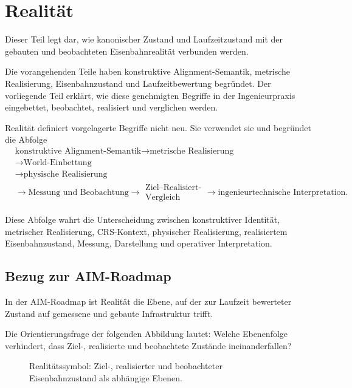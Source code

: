 
\chapter*{Realität}
{}

Dieser Teil legt dar, wie kanonischer Zustand und Laufzeitzustand mit der
gebauten und beobachteten Eisenbahnrealität verbunden werden.

Die vorangehenden Teile haben konstruktive Alignment-Semantik, metrische
Realisierung, Eisenbahnzustand und Laufzeitbewertung begründet. Der vorliegende
Teil erklärt, wie diese genehmigten Begriffe in der Ingenieurpraxis
eingebettet, beobachtet, realisiert und verglichen werden.

Realität definiert vorgelagerte Begriffe nicht neu. Sie verwendet sie und
begründet die Abfolge
\[
\begin{aligned}
&\text{konstruktive Alignment-Semantik}
\rightarrow
\text{metrische Realisierung}
\\
&\rightarrow
\text{World-Einbettung}
\\
&\rightarrow
\text{physische Realisierung}
\\
&\rightarrow
\text{Messung und Beobachtung}
\rightarrow
\substack{\text{Ziel--Realisiert-}\\\text{Vergleich}}
\rightarrow
\text{ingenieurtechnische Interpretation}.
\end{aligned}
\]

Diese Abfolge wahrt die Unterscheidung zwischen konstruktiver Identität,
metrischer Realisierung, CRS-Kontext, physischer Realisierung, realisiertem
Eisenbahnzustand, Messung, Darstellung und operativer Interpretation.

\section*{Bezug zur AIM-Roadmap}

In der AIM-Roadmap ist Realität die Ebene, auf der zur Laufzeit bewerteter
Zustand auf gemessene und gebaute Infrastruktur trifft.

Die Orientierungsfrage der folgenden Abbildung lautet: Welche Ebenenfolge
verhindert, dass Ziel-, realisierte und beobachtete Zustände ineinanderfallen?

\begin{figure}[ht]
\centering

\caption{Realitätssymbol: Ziel-, realisierter und beobachteter Eisenbahnzustand als abhängige Ebenen.}
\label{fig:icon-reality-target-realized-observed}
\end{figure}

